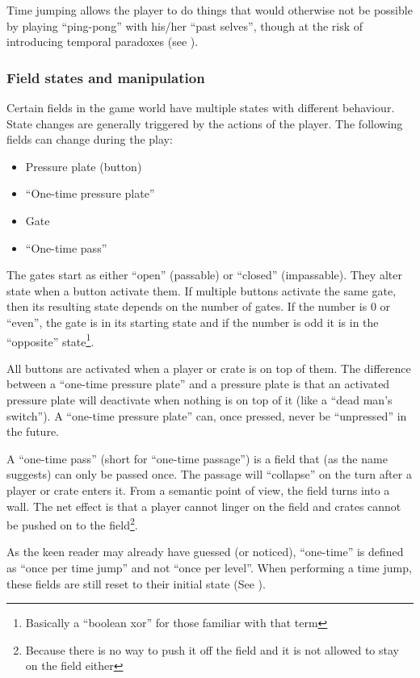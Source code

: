 Time jumping allows the player to do things that would otherwise not
be possible by playing ``ping-pong'' with his/her ``past selves'',
though at the risk of introducing temporal paradoxes (see
).

\subsubsection{Field states and manipulation}
\label{field-states}
Certain fields in the game world have multiple states with different
behaviour.  State changes are generally triggered by the actions of
the player.  The following fields can change during the play:

\begin{itemize}
\item Pressure plate (button)
\item ``One-time pressure plate''
\item Gate
\item ``One-time pass''
\end{itemize}

The gates start as either ``open'' (passable) or ``closed''
(impassable).  They alter state when a button activate them.  If
multiple buttons activate the same gate, then its resulting state
depends on the number of gates.  If the number is 0 or ``even'', the
gate is in its starting state and if the number is odd it is in the
``opposite'' state\footnote{Basically a ``boolean xor'' for those
  familiar with that term}.

All buttons are activated when a player or crate is on top of them.
The difference between a ``one-time pressure plate'' and a pressure plate is
that an activated pressure plate will deactivate when nothing is on
top of it (like a ``dead man's switch'').  A ``one-time pressure plate'' can,
once pressed, never be ``unpressed'' in the future.

A ``one-time pass'' (short for ``one-time passage'') is a field that
(as the name suggests) can only be passed once.  The passage will
``collapse'' on the turn after a player or crate enters it.  From a
semantic point of view, the field turns into a wall.  The net effect
is that a player cannot linger on the field and crates cannot be pushed
on to the field\footnote{Because there is no way to push it off the field
and it is not allowed to stay on the field either}.

As the keen reader may already have guessed (or noticed), ``one-time''
is defined as ``once per time jump'' and not ``once per level''.  When
performing a time jump, these fields are still reset to their initial
state (See ).


